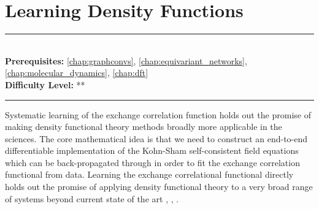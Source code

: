 \documentclass[book.tex]{subfiles}
\begin{document}
\chapter{Learning Density Functions}


\label{chap:differentiable_dft}
\noindent\rule{11cm}{0.4pt} \\
\textbf{Prerequisites:} \autoref{chap:graphconvs}, \autoref{chap:equivariant_networks}, \autoref{chap:molecular_dynamics},  \autoref{chap:dft} \\
\textbf{Difficulty Level:} ** \\
\noindent\rule{11cm}{0.4pt}
\vspace{5mm}

Systematic learning of the exchange correlation function holds out the promise of making density functional theory methods broadly more applicable in the sciences. The core mathematical idea is that we need to construct an end-to-end differentiable implementation of the Kohn-Sham self-consistent field equations which can be back-propagated through in order to fit the exchange correlation functional from data. Learning the exchange correlational functional directly holds out the promise of applying density functional theory to a very broad range of systems beyond current state of the art \cite{kasim2021learning}, \cite{kirkpatrick2021pushing}, \cite{dick2021using}. 

\end{document}
